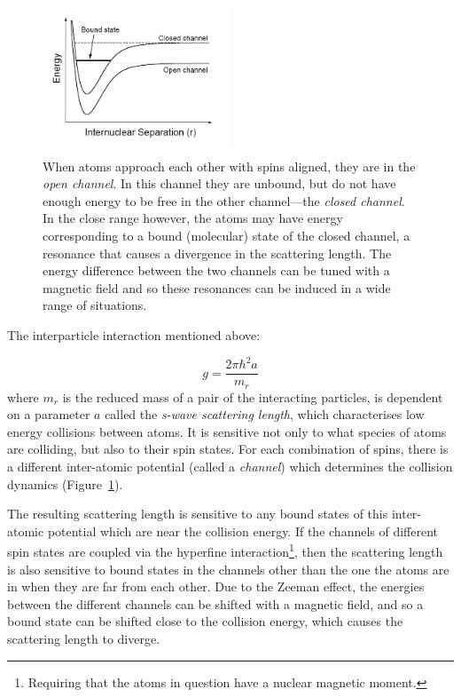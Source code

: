 \begin{figure}%
\begin{center}
\includegraphics[width=0.5\textwidth]{figures/unsorted/feshbach.png}
\caption{When atoms approach each other with spins aligned, they are in the \emph{open channel}. In this channel they are unbound, but do not have enough energy to be free in the other channel---the \emph{closed channel}. In the close range however, the atoms may have energy corresponding to a bound (molecular) state of the closed channel, a resonance that causes a divergence in the scattering length. The energy difference between the two channels can be tuned with a magnetic field and so these resonances can be induced in a wide range of situations.}\label{fig:feshbach}
\end{center}
\end{figure}
The interparticle interaction mentioned above:

\begin{equation}
g = \frac{2\pi \hbar^2 a}{m_r}
\end{equation}
where $m_r$ is the reduced mass of a pair of the interacting particles, is dependent on a parameter $a$ called the \emph{s-wave scattering length}, which characterises low energy collisions between atoms. It is sensitive not only to what species of atoms are colliding, but also to their spin states. For each combination of spins, there is a different inter-atomic potential (called a \emph{channel}) which determines the collision dynamics (Figure~\ref{fig:feshbach}).

The resulting scattering length is sensitive to any bound states of this inter-atomic potential which are near the collision energy. If the channels of different spin states are coupled via the hyperfine interaction\footnote{Requiring that the atoms in question have a nuclear magnetic moment.}, then the scattering length is also sensitive to bound states in the channels other than the one the atoms are in when they are far from each other. Due to the Zeeman effect, the energies between the different channels can be shifted with a magnetic field, and so a bound state can be shifted close to the collision energy, which causes the scattering length to diverge.

